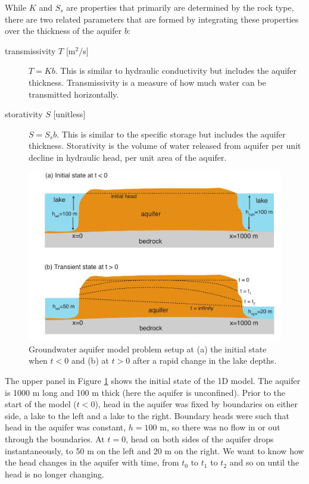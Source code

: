 \documentclass[11pt, oneside]{article}   	%
\begin{document}
While $K$ and $S_s$ are properties that primarily are determined by the rock type, there are two related parameters that are formed by integrating these properties over the thickness of the aquifer $b$:

\begin{description}
\item[transmissivity $T$ {\rm [m$^2$/s]} ]  $T = K b$. This is similar to hydraulic conductivity but includes the aquifer thickness.  Transmissivity is a measure of how much water can be transmitted horizontally.
\item [storativity $S$ {\rm [unitless]}] $S = S_s b$.  This is similar to the specific storage but  includes the aquifer thickness. Storativity is the volume of water released from aquifer per unit decline in hydraulic head, per unit area of the aquifer.
\end{description}



\begin{figure}[htbp]
\begin{center}
\includegraphics[width=.75\textwidth]{aquifer_model.pdf}
\caption{Groundwater aquifer model problem setup at (a) the initial state when $t<0$ and (b) at $t>0$ after a rapid change in the lake depths.     }
\label{model}
\end{center}
\end{figure}

The upper panel in Figure \ref{model} shows the initial state of the 1D model. The aquifer is 1000 m long and 100 m thick (here the aquifer is unconfined). Prior to the start of the model ($t < 0$), head in the aquifer was fixed by boundaries on either side, a lake to the left and a lake to the right. Boundary heads were such that head in the aquifer was constant, $h = 100$ m, so there was no flow in or out through the boundaries. At $t = 0$, head on both sides of the aquifer drops instantaneously, to 50 m on the left and 20 m on the right. We want to know how the head changes in the aquifer with time, from $t_0$ to $t_1$ to $t_2$ and so on until the head is no longer changing. 
\end{document}
